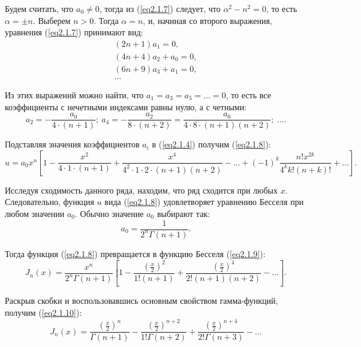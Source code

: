     Будем считать, что \( a_0 \ne 0 \), тогда из (\ref{eq2.1.7}) следует, что
    \( \alpha^2 - n^2 = 0 \), то есть \( \alpha = \pm n \). Выберем \( n > 0 \).
    Тогда \( \alpha = n \), и, начиная со второго выражения, уравнения (\ref{eq2.1.7})
    принимают вид:
    \[
    \begin{array}{l}
        (2n + 1)a_1 = 0, \\
        (4n + 4)a_2 + a_0 = 0, \\
        (6n + 9)a_3 + a_1 = 0, \\
        \ldots
    \end{array}
    \]
    
    Из этих выражений можно найти, что \( a_1 = a_3 = a_5 = \ldots = 0 \), то
    есть все коэффициенты с нечетными индексами равны нулю, а с четными:
    \[
        a_2 = -\frac{a_0}{4\cdot(n+1)};
        \ a_4 = -\frac{a_2}{8\cdot(n+2)} =
        \frac{a_0}{4\cdot8\cdot(n+1)(n+2)}; \ \ldots.
    \]
    
    Подставляя значения коэффициентов \( a_i \) в (\ref{eq2.1.4}) получим (\ref{eq2.1.8}):
    \begin{equation}
        u = a_0x^n\left[1 - \frac{x^2}{4\cdot1\cdot(n+1)} +
        \frac{x^4}{4^2\cdot1\cdot2\cdot(n+1)(n+2)} - \ldots + (-1)^k\frac{n!x^{2k}}
        {4^kk!(n+k)!} + \ldots \right].
        \label{eq2.1.8}
    \end{equation}
    
    Исследуя сходимость данного ряда, находим, что ряд сходится при любых \( x \). Следовательно, функция \( u \) вида (\ref{eq2.1.8}) удовлетворяет уравнению Бесселя при любом значении \( a_0 \). Обычно значение \( a_0 \) выбирают так:
    \[ a_0 = \frac{1}{2^n\Gamma(n + 1)}. \]
    
    Тогда функция (\ref{eq2.1.8}) превращается в функцию Бесселя (\ref{eq2.1.9}):
    \begin{equation}
        J_n(x) = \frac{x^n}{2^n\Gamma(n+1)}\left[1 - \frac{\left(\frac{x}{2}\right)^2}{1!(n+1)} + \frac{\left(\frac{x}{2}\right)^4}{2!(n+1)(n+2)} - \ldots\right].
        \label{eq2.1.9}
    \end{equation}
    
    Раскрыв скобки и воспользовавшись основным свойством гамма-функций, получим (\ref{eq2.1.10}):
    \begin{equation}
        J_n(x) = \frac{\left(\frac{x}{2}\right)^n}{\Gamma(n+1)} - \frac{\left(\frac{x}{2}\right)^{n+2}}{1!\Gamma(n+2)} + \frac{\left(\frac{x}{2}\right)^{n+4}}{2!\Gamma(n+3)} - \ldots
        \label{eq2.1.10}
    \end{equation}
    
